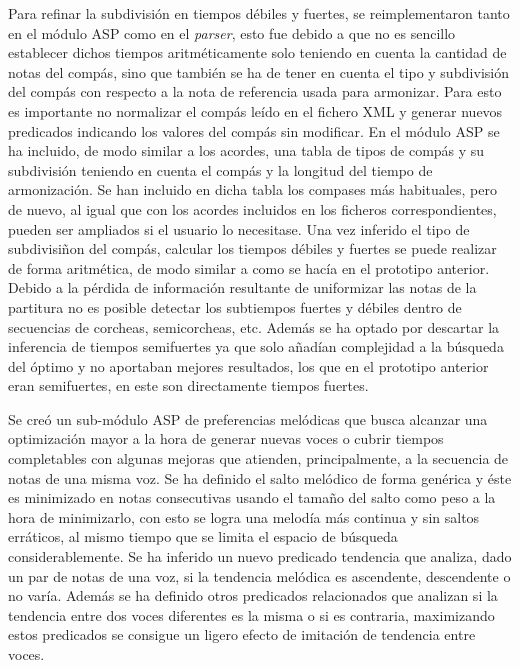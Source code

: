 Para refinar la subdivisión en tiempos débiles y fuertes, se reimplementaron tanto en el módulo ASP como en el \textit{parser}, esto fue debido a que no es sencillo establecer dichos tiempos aritméticamente solo teniendo en cuenta la cantidad de notas del compás, sino que también se ha de tener en cuenta el tipo y subdivisión del compás con respecto a la nota de referencia usada para armonizar. Para esto es importante no normalizar el compás leído en el fichero XML y generar nuevos predicados indicando los valores del compás sin modificar. En el módulo ASP se ha incluido, de modo similar a los acordes, una tabla de tipos de compás y su subdivisión teniendo en cuenta el compás y la longitud del tiempo de armonización. Se han incluido en dicha tabla los compases más habituales, pero de nuevo, al igual que con los acordes incluidos en los ficheros correspondientes, pueden ser ampliados si el usuario lo necesitase. Una vez inferido el tipo de subdivisiñon del compás, calcular los tiempos débiles y fuertes se puede realizar de forma aritmética, de modo similar a como se hacía en el prototipo anterior. Debido a la pérdida de información resultante de uniformizar las notas de la partitura no es posible detectar los subtiempos fuertes y débiles dentro de secuencias de corcheas, semicorcheas, etc. Además se ha optado por descartar la inferencia de tiempos semifuertes ya que solo añadían complejidad a la búsqueda del óptimo y no aportaban mejores resultados, los que en el prototipo anterior eran semifuertes, en este son directamente tiempos fuertes.

Se creó un sub-módulo ASP de preferencias melódicas que busca alcanzar una optimización mayor a la hora de generar nuevas voces o cubrir tiempos completables con algunas mejoras que atienden, principalmente, a la secuencia de notas de una misma voz. Se ha definido el salto melódico de forma genérica y éste es minimizado en notas consecutivas usando el tamaño del salto como peso a la hora de minimizarlo, con esto se logra una melodía más continua y sin saltos erráticos, al mismo tiempo que se limita el espacio de búsqueda considerablemente. Se ha inferido un nuevo predicado tendencia que analiza, dado un par de notas de una voz, si la tendencia melódica es ascendente, descendente o no varía. Además se ha definido otros predicados relacionados que analizan si la tendencia entre dos voces diferentes es la misma o si es contraria, maximizando estos predicados se consigue un ligero efecto de imitación de tendencia entre voces.

